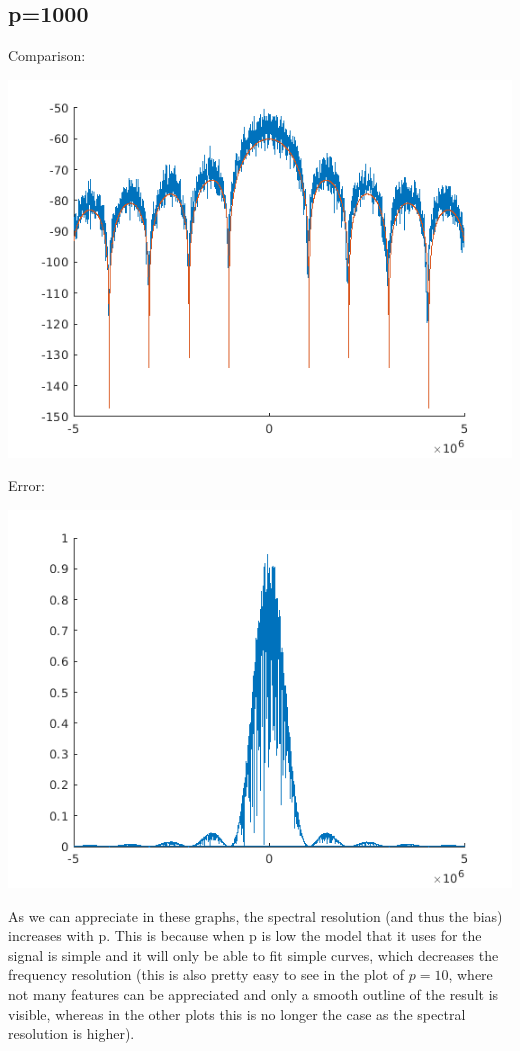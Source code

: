 \documentclass[conference,9pt]{IEEEtran}
\begin{document}
\subsection{p=1000}
Comparison:

\includegraphics[scale=0.6]{arp1000.png}

Error:

\includegraphics[scale=0.6]{earp1000.png}

As we can appreciate in these graphs, the spectral resolution (and thus the bias) increases with p. This is because when p is low the model that it uses for the signal is simple and it will only be able to fit simple curves, which decreases the frequency resolution (this is also pretty easy to see in the plot of $p=10$, where not many features can be appreciated and only a smooth outline of the result is visible, whereas in the other plots this is no longer the case as the spectral resolution is higher).
\end{document}
